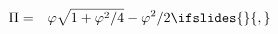 \begin{eqnarray}
       \Pi & = & \varphi \sqrt{1+\varphi^{2}/4} - \varphi^{2}/2 \label{eq:muthOptimal}
\ifslides{}{,}
\end{eqnarray}
